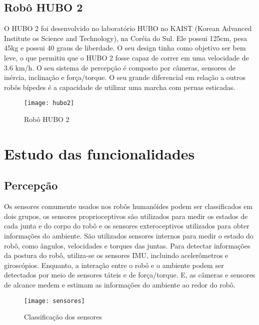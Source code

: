 \subsection{Robô HUBO 2}
\label{ssec:hubo}

O HUBO 2 foi desenvolvido no laboratório HUBO no KAIST (Korean Advanced Institute os Science and Technology), na Coréia do Sul. Ele possui 125cm, pesa 45kg e possui 40 graus de liberdade. O seu design tinha como objetivo ser bem leve, o que permitiu que o HUBO 2 fosse capaz de correr em uma velocidade de 3.6 km/h. O seu sistema de percepção é composto por câmeras, sensores de inércia, inclinação e  força/torque. O seu grande diferencial em relação a outros robôs bípedes é a capacidade de utilizar uma marcha com pernas esticadas.

\begin{figure} [H]
    \centering
    \caption{Robô HUBO 2}
    \texttt{[image: hubo2]}
    \label{fig:hubo2}
\end{figure}


\section{Estudo das funcionalidades}
\label{sec:robos}

\subsection{Percepção}
\label{ssec:percepcao}

Os sensores comumente usados nos robôs humanóides podem ser classificados em dois grupos, os sensores proprioceptivos são utilizados para medir os estados de cada junta e do corpo do robô e os sensores exteroceptivos utilizados para obter informações do ambiente. São utilizados sensores internos para medir o estado do robô, como ângulos, velocidades e torques das juntas. Para detectar informações da postura do robô, utiliza-se os sensores IMU, incluindo acelerômetros e giroscópios. Enquanto, a interação entre o robô e o ambiente podem ser detectados por meio de sensores táteis e de força/torque. E, as câmeras e sensores de alcance medem e estimam as informações do ambiente ao redor do robô. 

\begin{figure} [H]
    \centering
    \caption{Classificação dos sensores}
    \texttt{[image: sensores]}
    \label{fig:sensors}
\end{figure}

